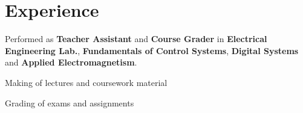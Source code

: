 \section{Experience \faGears}

Performed as \textbf{Teacher Assistant} and \textbf{Course Grader} in \textbf{Electrical Engineering Lab.}, \textbf{Fundamentals of Control Systems}, \textbf{Digital Systems} and \textbf{Applied Electromagnetism}.
\begin{tightemize}
\item Making of lectures and coursework material
\item Grading of exams and assignments
\end{tightemize}
\sectionsep

